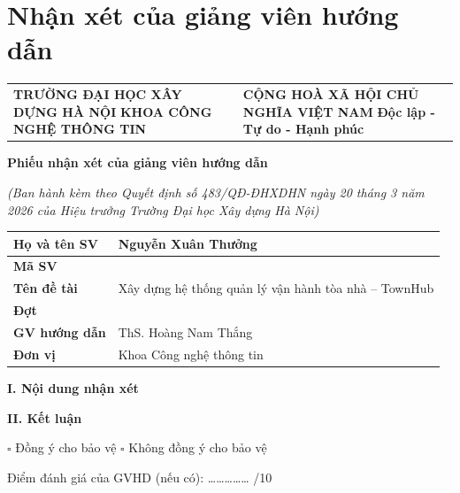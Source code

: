 \chapter*{Nhận xét của giảng viên hướng dẫn}
\begin{center}{\singlespacing\renewcommand{\arraystretch}{1.2}
\begin{tabular}{>{\raggedright\arraybackslash}p{}>{\centering\arraybackslash}p{}}
\textbf{TRƯỜNG ĐẠI HỌC XÂY DỰNG HÀ NỘI} \newline \textbf{KHOA CÔNG NGHỆ THÔNG TIN} & \textbf{CỘNG HOÀ XÃ HỘI CHỦ NGHĨA VIỆT NAM} \newline \textbf{Độc lập - Tự do - Hạnh phúc} \\
\end{tabular}}\end{center}
\textbf{Phiếu nhận xét của giảng viên hướng dẫn}

\textit{(Ban hành kèm theo Quyết định số 483/QĐ-ĐHXDHN ngày 20 tháng 3 năm 2026 của Hiệu trưởng Trường Đại học Xây dựng Hà Nội)}

\begin{center}{\singlespacing\renewcommand{\arraystretch}{1.25}
\begin{tabular}{|>{\raggedright\arraybackslash}p{}|>{\raggedright\arraybackslash}p{}|}
\hline
\textbf{Họ và tên SV} & Nguyễn Xuân Thưởng \\ \hline
\textbf{Mã SV} & 0220766 \\ \hline
\textbf{Tên đề tài} & Xây dựng hệ thống quản lý vận hành tòa nhà – TownHub \\ \hline
\textbf{Đợt} & 2026 \\ \hline
\textbf{GV hướng dẫn} & ThS. Hoàng Nam Thắng \\ \hline
\textbf{Đơn vị} & Khoa Công nghệ thông tin \\ \hline
\end{tabular}}\end{center}
\textbf{I. Nội dung nhận xét}

\textbf{II. Kết luận}

$\square$ Đồng ý cho bảo vệ                    $\square$ Không đồng ý cho bảo vệ

Điểm đánh giá của GVHD (nếu có):  \ldots{}\ldots{}\ldots{}\ldots{}\ldots{} /10

